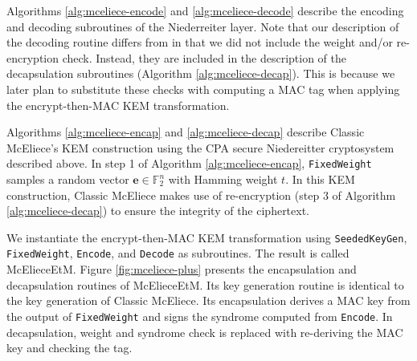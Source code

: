 \documentclass[runningheads]{llncs}
\begin{document}
Algorithms \ref{alg:mceliece-encode} and \ref{alg:mceliece-decode} describe the encoding and decoding subroutines of the Niederreiter layer. Note that our description of the decoding routine differs from \cite{ClassicMcEliece2022} in that we did not include the weight and/or re-encryption check. Instead, they are included in the description of the decapsulation subroutines (Algorithm \ref{alg:mceliece-decap}). This is because we later plan to substitute these checks with computing a MAC tag when applying the encrypt-then-MAC KEM transformation.

Algorithms \ref{alg:mceliece-encap} and \ref{alg:mceliece-decap} describe Classic McEliece's KEM construction using the CPA secure Niedereitter cryptosystem described above. In step 1 of Algorithm \ref{alg:mceliece-encap}, \texttt{FixedWeight} samples a random vector $\mathbf{e}\in\mathbb{F}_2^n$ with Hamming weight $t$. In this KEM construction, Classic McEliece makes use of re-encryption (step 3 of Algorithm \ref{alg:mceliece-decap}) to ensure the integrity of the ciphertext. \vspace{0.1cm}

 We instantiate the encrypt-then-MAC KEM transformation using \texttt{SeededKeyGen}, \texttt{FixedWeight}, \texttt{Encode}, and \texttt{Decode} as subroutines. The result is called McElieceEtM. Figure \ref{fig:mceliece-plus} presents the encapsulation and decapsulation routines of McElieceEtM. Its key generation routine is identical to the key generation of Classic McEliece. Its encapsulation derives a MAC key from the output of \texttt{FixedWeight} and signs the syndrome computed from \texttt{Encode}. In decapsulation, weight and syndrome check is replaced with re-deriving the MAC key and checking the tag.
\end{document}
